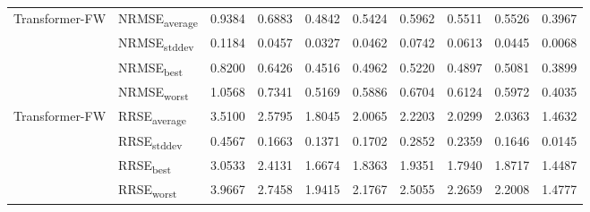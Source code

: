 {\begin{longtable}{l l c c c c c c c c}
\cmidrule(lr){2-10}
\multirow{4}{*}{Transformer-FW} & NRMSE\textsubscript{average} & 0.9384 & 0.6883 & 0.4842 & 0.5424 & 0.5962 & 0.5511 & 0.5526 & 0.3967 \\
 & NRMSE\textsubscript{stddev} & 0.1184 & 0.0457 & 0.0327 & 0.0462 & 0.0742 & 0.0613 & 0.0445 & 0.0068 \\
 & NRMSE\textsubscript{best} & 0.8200 & 0.6426 & 0.4516 & 0.4962 & 0.5220 & 0.4897 & 0.5081 & 0.3899 \\
 & NRMSE\textsubscript{worst} & 1.0568 & 0.7341 & 0.5169 & 0.5886 & 0.6704 & 0.6124 & 0.5972 & 0.4035 \\
\cmidrule(lr){2-10}
\multirow{4}{*}{Transformer-FW} & RRSE\textsubscript{average} & 3.5100 & 2.5795 & 1.8045 & 2.0065 & 2.2203 & 2.0299 & 2.0363 & 1.4632 \\
 & RRSE\textsubscript{stddev} & 0.4567 & 0.1663 & 0.1371 & 0.1702 & 0.2852 & 0.2359 & 0.1646 & 0.0145 \\
 & RRSE\textsubscript{best} & 3.0533 & 2.4131 & 1.6674 & 1.8363 & 1.9351 & 1.7940 & 1.8717 & 1.4487 \\
 & RRSE\textsubscript{worst} & 3.9667 & 2.7458 & 1.9415 & 2.1767 & 2.5055 & 2.2659 & 2.2008 & 1.4777 \\
\cmidrule(lr){2-10}
\end{longtable}
}